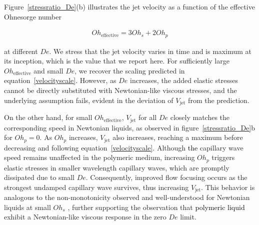 \documentclass{jfm}
\newcommand{\DL}[1]{{\textcolor{black}{#1}}}
\begin{document}
Figure~\ref{stressratio_De}(b) illustrates the jet velocity as a function of the effective Ohnesorge number

\begin{align}
   Oh_\text{effective} = 3Oh_s+2Oh_p
\end{align}

\noindent \DL{(reflecting equation~\eqref{eqn:etaEff})} at different $De$. We stress that the jet velocity varies in time \citep{deike2018dynamics,sanjay-2022-JFM,gordillo2023theory} and is maximum at its inception, which is the value that we report here.
For sufficiently large $Oh_{\text{effective}}$ and small $De$, we recover the scaling predicted in equation~\eqref{velocityscale}. However, as $De$ increases, the added elastic stresses cannot be directly substituted with Newtonian-like viscous stresses, and the underlying assumption fails, evident in the deviation of $V_{\text{jet}}$ from the prediction.

On the other hand, for small $Oh_{\text{effective}}$, $V_{\text{jet}}$ for all $De$ closely matches the corresponding speed in Newtonian liquids, as observed in figure~\ref{stressratio_De}b for $Oh_p = 0$. As $Oh_{p}$ increases, $V_{\text{jet}}$ also increases, reaching a maximum before decreasing and following equation~\eqref{velocityscale}.
Although \DL{the} capillary wave speed remains unaffected in the polymeric medium, increasing $Oh_p$ triggers elastic stresses in smaller wavelength capillary waves, which are promptly dissipated due to small $De$. Consequently, improved flow focusing occurs as the strongest undamped capillary wave survives, thus increasing $V_{\text{jet}}$. This behavior is analogous to the non-monotonicity observed and well-understood for Newtonian liquids at small $Oh_s$ \citep{duchemin2002jet, deike2018dynamics, gordillo2019capillary,sanjay-2022-JFM,yang2020multitude,gordillo2023theory}, further supporting the observation that \DL{polymeric liquid} exhibit a Newtonian-like viscous response in the zero $De$ limit.
\end{document}
